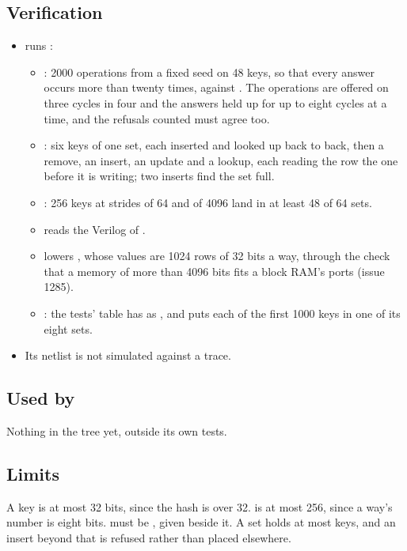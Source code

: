 \subsection*{Verification}

\begin{itemize}
\item {} runs :
\begin{itemize}
\item {}: 2000
operations from a fixed seed on 48 keys, so that every answer occurs
more than twenty times, against . The operations
are offered on three cycles in four and the answers held up for up to
eight cycles at a time, and the refusals counted must agree too.
\item {}: six keys of
one set, each inserted and looked up back to back, then a remove, an
insert, an update and a lookup, each reading the row the one before it
is writing; two inserts find the set full.
\item {}: 256 keys at strides
of 64 and of 4096 land in at least 48 of 64 sets.
\item {} reads the
Verilog of .
\item {} lowers
, whose values are 1024 rows of 32
bits a way, through the check that a memory of more than 4096 bits
fits a block RAM's ports (issue 1285).
\item {}: the tests' table has  as
, and  puts each of the first 1000 keys in
one of its eight sets.
\end{itemize}
\item Its netlist is not simulated against a trace.
\end{itemize}

\subsection*{Used by}

Nothing in the tree yet, outside its own tests.

\subsection*{Limits}

A key is at most 32 bits, since the hash is over 32.  is at
most 256, since a way's number is eight bits.  must be
, given beside it. A set holds at most  keys, and
an insert beyond that is refused rather than placed elsewhere.
